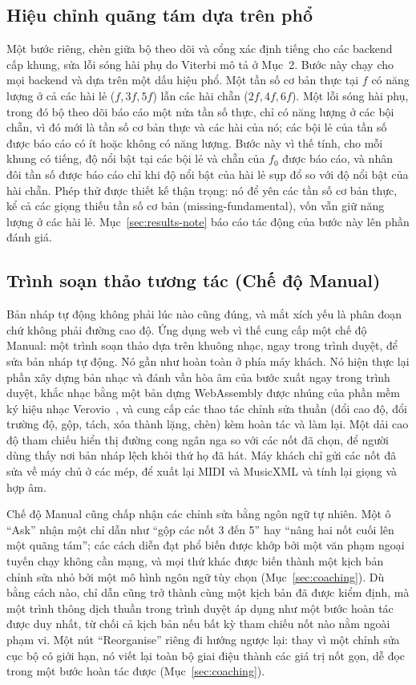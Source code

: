 \documentclass[12pt,a4paper]{article}
\begin{document}
\subsection{Hiệu chỉnh quãng tám dựa trên phổ}
\label{sec:octave}

Một bước riêng, chèn giữa bộ theo dõi và cổng xác định tiếng cho các backend cấp
khung, sửa lỗi sóng hài phụ do Viterbi mô tả ở Mục~2. Bước này chạy cho mọi backend
và dựa trên một dấu hiệu phổ. Một tần số cơ bản thực tại $f$ có năng lượng ở cả các
hài lẻ ($f, 3f, 5f$) lẫn các hài chẵn ($2f, 4f, 6f$). Một lỗi sóng hài phụ, trong
đó bộ theo dõi báo cáo một nửa tần số thực, chỉ có năng lượng ở các bội chẵn, vì đó
mới là tần số cơ bản thực và các hài của nó; các bội lẻ của tần số được báo cáo có
ít hoặc không có năng lượng. Bước này vì thế tính, cho mỗi khung có tiếng, độ nổi
bật tại các bội lẻ và chẵn của $f_0$ được báo cáo, và nhân đôi tần số được báo cáo
chỉ khi độ nổi bật của hài lẻ sụp đổ so với độ nổi bật của hài chẵn. Phép thử được
thiết kế thận trọng: nó để yên các tần số cơ bản thực, kể cả các giọng thiếu tần số
cơ bản (missing-fundamental), vốn vẫn giữ năng lượng ở các hài lẻ.
Mục~\ref{sec:results-note} báo cáo tác động của bước này lên phần đánh giá.

\subsection{Trình soạn thảo tương tác (Chế độ Manual)}

Bản nháp tự động không phải lúc nào cũng đúng, và mắt xích yếu là phân đoạn chứ
không phải đường cao độ. Ứng dụng web vì thế cung cấp một chế độ Manual: một trình
soạn thảo dựa trên khuông nhạc, ngay trong trình duyệt, để sửa bản nháp tự động. Nó
gần như hoàn toàn ở phía máy khách. Nó hiện thực lại phần xây dựng bản nhạc và đánh
vần hòa âm của bước xuất ngay trong trình duyệt, khắc nhạc bằng một bản dựng
WebAssembly được nhúng của phần mềm ký hiệu nhạc Verovio~\cite{verovio}, và cung cấp
các thao tác chỉnh sửa thuần (đổi cao độ, đổi trường độ, gộp, tách, xóa thành lặng,
chèn) kèm hoàn tác và làm lại. Một dải cao độ tham chiếu hiển thị đường cong ngân
nga so với các nốt đã chọn, để người dùng thấy nơi bản nháp lệch khỏi thứ họ đã
hát. Máy khách chỉ gửi các nốt đã sửa về máy chủ ở các mép, để xuất lại MIDI và
MusicXML và tính lại giọng và hợp âm.

Chế độ Manual cũng chấp nhận các chỉnh sửa bằng ngôn ngữ tự nhiên. Một ô ``Ask''
nhận một chỉ dẫn như ``gộp các nốt 3 đến 5'' hay ``nâng hai nốt cuối lên một quãng
tám''; các cách diễn đạt phổ biến được khớp bởi một văn phạm ngoại tuyến chạy không
cần mạng, và mọi thứ khác được biến thành một kịch bản chỉnh sửa nhỏ bởi một mô hình
ngôn ngữ tùy chọn (Mục~\ref{sec:coaching}). Dù bằng cách nào, chỉ dẫn cũng trở thành
cùng một kịch bản đã được kiểm định, mà một trình thông dịch thuần trong trình duyệt
áp dụng như một bước hoàn tác được duy nhất, từ chối cả kịch bản nếu bất kỳ tham
chiếu nốt nào nằm ngoài phạm vi. Một nút ``Reorganise'' riêng đi hướng ngược lại:
thay vì một chỉnh sửa cục bộ có giới hạn, nó viết lại toàn bộ giai điệu thành các
giá trị nốt gọn, dễ đọc trong một bước hoàn tác được (Mục~\ref{sec:coaching}).
\end{document}
